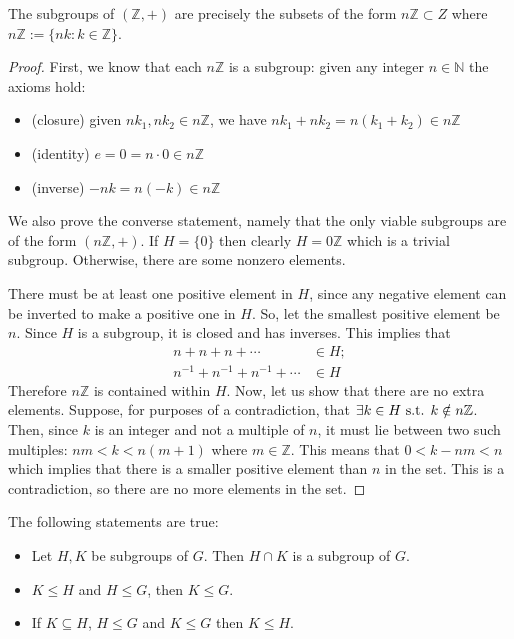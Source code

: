 \begin{proposition}
	The subgroups of \((\mathbb Z, +)\) are precisely the subsets of the form \(n\mathbb Z \subset Z\) where \(n\mathbb Z := \{nk : k\in \mathbb Z\}\).
\end{proposition}
\begin{proof}
	First, we know that each \(n\mathbb Z\) is a subgroup: given any integer \(n \in \mathbb N\) the axioms hold:
	\begin{itemize}
		\item (closure) given \(nk_1, nk_2 \in n\mathbb Z\), we have \(nk_1 + nk_2 = n(k_1 + k_2) \in n\mathbb Z\)
		\item (identity) \(e = 0 = n \cdot 0 \in n\mathbb Z\)
		\item (inverse) \(-nk = n(-k) \in n\mathbb Z\)
	\end{itemize}
	We also prove the converse statement, namely that the only viable subgroups are of the form \((n\mathbb Z, +)\).
	If \(H = \{ 0 \}\) then clearly \(H = 0\mathbb Z\) which is a trivial subgroup.
	Otherwise, there are some nonzero elements.

	There must be at least one positive element in \(H\), since any negative element can be inverted to make a positive one in \(H\).
	So, let the smallest positive element be \(n\).
	Since \(H\) is a subgroup, it is closed and has inverses.
	This implies that
	\begin{align*}
		n+n+n+\cdots                & \in H; \\
		n^{-1}+n^{-1}+n^{-1}+\cdots & \in H
	\end{align*}
	Therefore \(n\mathbb Z\) is contained within \(H\).
	Now, let us show that there are no extra elements.
	Suppose, for purposes of a contradiction, that \(\exists k \in H \text{ s.t. } k \notin n\mathbb Z\).
	Then, since \(k\) is an integer and not a multiple of \(n\), it must lie between two such multiples: \(nm < k < n(m+1)\) where \(m \in \mathbb Z\).
	This means that \(0 < k - nm < n\) which implies that there is a smaller positive element than \(n\) in the set.
	This is a contradiction, so there are no more elements in the set.
\end{proof}

\begin{proposition}
	The following statements are true:
	\begin{itemize}
		\item Let \(H, K\) be subgroups of \(G\).
		      Then \(H \cap K\) is a subgroup of \(G\).
		\item \(K \leq H\) and \(H \leq G\), then \(K \leq G\).
		\item If \(K \subseteq H\), \(H \leq G\) and \(K \leq G\) then \(K \leq H\).
	\end{itemize}
\end{proposition}

